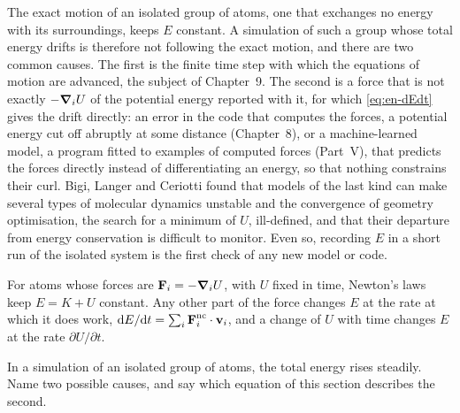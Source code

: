 \begin{practice}
The exact motion of an isolated group of atoms, one that exchanges no
energy with its surroundings, keeps $E$ constant. A simulation of such a
group whose total energy drifts is therefore not following the exact
motion, and there are two common causes. The first is the finite time
step with which the equations of motion are advanced, the subject of
Chapter~9. The second is a force that is not exactly $-\bm{\nabla}_i U$ of the
potential energy reported with it, for which \cref{eq:en-dEdt} gives the
drift directly: an error in the code that computes the forces, a
potential energy cut off abruptly at some distance (Chapter~8), or a machine-learned
model, a program fitted to examples of computed forces (Part~V), that
predicts the forces directly instead of differentiating an
energy, so that nothing constrains their curl. Bigi, Langer and Ceriotti
found that models of the last kind can make several types of molecular
dynamics unstable and the convergence of geometry optimisation, the
search for a minimum of $U$, ill-defined, and that their departure from
energy conservation is difficult to monitor\cite{Bigi2025}. Even so,
recording $E$ in a short run of the isolated system is the first check of any new
model or code.
\end{practice}

\begin{keyidea}
For atoms whose forces are $\bm{\mathrm{F}}_i = -\bm{\nabla}_i U$, with $U$ fixed in
time, Newton's laws keep $E = K + U$ constant. Any other part of the
force changes $E$ at the rate at which it does work, $\mathrm{d} E/\mathrm{d} t =
\sum_i\bm{\mathrm{F}}_i^{\mathrm{nc}}\cdot\bm{\mathrm{v}}_i$, and a change of $U$ with time
changes $E$ at the rate $\partial U/\partial t$.
\end{keyidea}


\begin{selfcheck}
In a simulation of an isolated group of atoms, the total energy rises
steadily. Name two possible causes, and say which equation of this
section describes the second.
\end{selfcheck}
